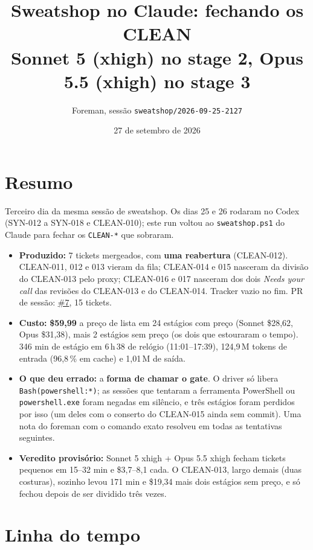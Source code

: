 \documentclass[11pt,a4paper]{article}
\title{Sweatshop no Claude: fechando os CLEAN\\\large Sonnet 5 (xhigh) no stage 2, Opus 5.5 (xhigh) no stage 3}
\author{Foreman, sessão \texttt{sweatshop/2026-09-25-2127}}
\date{27 de setembro de 2026}
\begin{document}
\maketitle

\section*{Resumo}

Terceiro dia da mesma sessão de sweatshop. Os dias 25 e 26 rodaram no Codex
(SYN-012 a SYN-018 e CLEAN-010); este run voltou ao
\texttt{sweatshop.ps1} do Claude para fechar os \texttt{CLEAN-*} que sobraram.

\begin{itemize}
  \item \textbf{Produzido:} 7 tickets mergeados, com \textbf{uma reabertura}
        (CLEAN-012). CLEAN-011, 012 e 013 vieram da fila; CLEAN-014 e 015
        nasceram da divisão do CLEAN-013 pelo proxy; CLEAN-016 e 017 nasceram
        dos dois \emph{Needs your call} das revisões do CLEAN-013 e do
        CLEAN-014. Tracker vazio no fim. PR de sessão:
        \href{https://github.com/Laginho/SynchroNice/pull/7}{\#7}, 15 tickets.
  \item \textbf{Custo:} \textbf{\$59,99} a preço de lista em 24 estágios com
        preço (Sonnet \$28,62, Opus \$31,38), mais 2 estágios sem preço (os dois
        que estouraram o tempo). 346 min de estágio em 6\,h\,38 de relógio
        (11:01--17:39), 124,9\,M tokens de entrada (96,8\,\% em cache) e
        1,01\,M de saída.
  \item \textbf{O que deu errado:} a \textbf{forma de chamar o gate}. O driver
        só libera \texttt{Bash(powershell:*)}; as sessões que tentaram a
        ferramenta PowerShell ou \texttt{powershell.exe} foram negadas em
        silêncio, e três estágios foram perdidos por isso (um deles com o
        conserto do CLEAN-015 ainda sem commit). Uma nota do foreman com o
        comando exato resolveu em todas as tentativas seguintes.
  \item \textbf{Veredito provisório:} Sonnet 5 xhigh + Opus 5.5 xhigh fecham
        tickets pequenos em 15--32 min e \$3,7--8,1 cada. O CLEAN-013, largo
        demais (duas costuras), sozinho levou 171 min e \$19,34 mais dois
        estágios sem preço, e só fechou depois de ser dividido três vezes.
\end{itemize}

\section{Linha do tempo}
\end{document}
